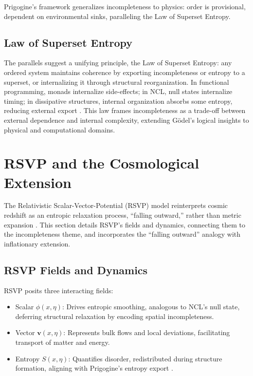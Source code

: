 \documentclass{article}
\begin{document}
Prigogine's framework generalizes incompleteness to physics: order is provisional, dependent on environmental sinks, paralleling the Law of Superset Entropy.

\subsection{Law of Superset Entropy}
The parallels suggest a unifying principle, the Law of Superset Entropy: any ordered system maintains coherence by exporting incompleteness or entropy to a superset, or internalizing it through structural reorganization. In functional programming, monads internalize side-effects; in NCL, null states internalize timing; in dissipative structures, internal organization absorbs some entropy, reducing external export \citep{wadler1992, fant2005, prigogine1984}. This law frames incompleteness as a trade-off between external dependence and internal complexity, extending G\"{o}del's logical insights to physical and computational domains.

\section{RSVP and the Cosmological Extension}
\label{sec:rsvp}
The Relativistic Scalar-Vector-Potential (RSVP) model reinterprets cosmic redshift as an entropic relaxation process, ``falling outward,'' rather than metric expansion \citep{whittle2015}. This section details RSVP's fields and dynamics, connecting them to the incompleteness theme, and incorporates the ``falling outward'' analogy with inflationary extension.

\subsection{RSVP Fields and Dynamics}
RSVP posits three interacting fields:

\begin{itemize}
    \item Scalar \(\phi(x,\eta)\): Drives entropic smoothing, analogous to NCL's null state, deferring structural relaxation by encoding spatial incompleteness.
    \item Vector \(\mathbf{v}(x,\eta)\): Represents bulk flows and local deviations, facilitating transport of matter and energy.
    \item Entropy \(S(x,\eta)\): Quantifies disorder, redistributed during structure formation, aligning with Prigogine's entropy export \citep{prigogine1984}.
\end{itemize}
\end{document}
